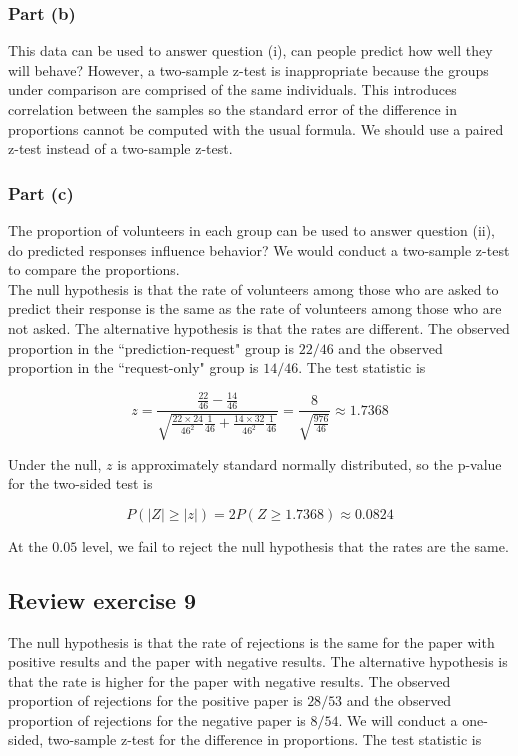 \documentclass[11pt]{article}
\newcommand{\pr}{P} %
\begin{document}
\subsubsection*{Part (b)}
This data can be used to answer question (i), can people predict how well they will behave?  However, a two-sample z-test is inappropriate because the groups under comparison are comprised of the same individuals.  This introduces correlation between the samples so the standard error of the difference in proportions cannot be computed with the usual formula.  We should use a paired z-test instead of a two-sample z-test.

\subsubsection*{Part (c)}
The proportion of volunteers in each group can be used to answer question (ii), do predicted responses influence behavior?  We would conduct a two-sample z-test to compare the proportions. \\

The null hypothesis is that the rate of volunteers among those who are asked to predict their response is the same as the rate of volunteers among those who are not asked.  The alternative hypothesis is that the rates are different.  The observed proportion in the ``prediction-request" group is $22/46$ and the observed proportion in the ``request-only" group is $14/46$.  The test statistic is

$$z = \frac{ \frac{22}{46}-\frac{14}{46}}{ \sqrt{\frac{22\times 24}{46^2}\frac{1}{46} + \frac{14\times32}{46^2}\frac{1}{46}}} = \frac{ 8}{ \sqrt{\frac{976}{46}}} \approx  1.7368$$

Under the null, $z$ is approximately standard normally distributed, so the p-value for the two-sided test is

$$\pr( \lvert Z \rvert \geq \lvert z \rvert) = 2 \pr(Z \geq 1.7368) \approx 0.0824$$

At the $0.05$ level, we fail to reject the null hypothesis that the rates are the same.


\subsection*{Review exercise 9} %
The null hypothesis is that the rate of rejections is the same for the paper with positive results and the paper with negative results.  The alternative hypothesis is that the rate is higher for the paper with negative results.  The observed proportion of rejections for the positive paper is $28/53$ and the observed proportion of rejections for the negative paper is $8/54$. We will conduct a one-sided, two-sample z-test for the difference in proportions.  The test statistic is
\end{document}
